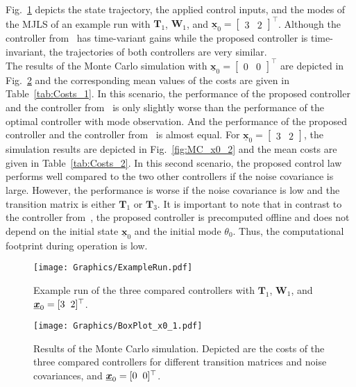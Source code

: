 \documentclass[preprint,1p,11pt]{IR-Template/ISAS_IR}
\newcommand{\rvec}[1]{\ensuremath{{\boldsymbol{\underline{#1}}}}}
\newcommand{\mat}[1]{{\ensuremath{{\mathbf{#1}}}}}
\newcommand{\tr}{^{\top}}
\newcommand{\xsys}[1]{\rvec{x}_{#1}}
\newcommand{\wCov}{\mat{W}}
\newcommand{\modeis}[1]{\theta_{#1}}
\newcommand{\TransitionMatrix}[1]{\mat{T}_{#1}}
\begin{document}
Fig.~\ref{fig:ExampleRun} depicts the state trajectory, the applied control inputs, and the modes of the MJLS of an example run with $\TransitionMatrix{1}$, $\wCov_1$, and $\xsys{0} = \begin{bmatrix}3 & 2 \end{bmatrix}\tr$. Although the controller from~\cite{Vargas_2013} has time-variant gains while the proposed controller is time-invariant, the trajectories of both controllers are very similar.\\

The results of the Monte Carlo simulation with $\xsys{0} = \begin{bmatrix}0 & 0 \end{bmatrix}\tr$ are depicted in Fig.~\ref{fig:MC_x0_1} and the corresponding mean values of the costs are given in Table~\ref{tab:Costs_1}. In this scenario, the performance of the proposed controller and the controller from~\cite{Vargas_2013} is only slightly worse than the performance of the optimal controller with mode observation. And the performance of the proposed controller and the controller from~\cite{Vargas_2013} is almost equal. For $\xsys{0}=\begin{bmatrix}3&2\end{bmatrix}$, the simulation results are depicted in Fig.~\ref{fig:MC_x0_2} and the mean costs are given in Table~\ref{tab:Costs_2}. In this second scenario, the proposed control law performs well compared to the two other controllers if the noise covariance is large. However, the performance is worse if the noise covariance is low and the transition matrix is either $\TransitionMatrix{1}$ or $\TransitionMatrix{3}$. It is important to note that in contrast to the controller from~\cite{Vargas_2013}, the proposed controller is precomputed offline and does not depend on the initial state $\xsys{0}$ and the initial mode $\modeis{0}$. Thus, the computational footprint during operation is low.\\

\begin{figure}[h]
\centering
\texttt{[image: Graphics/ExampleRun.pdf]}
\caption{Example run of the three compared controllers with $\TransitionMatrix{1}$, $\wCov_1$, and $\xsys{0} =\lbrack 3\hspace{2mm}  2\rbrack\tr$.}
\label{fig:ExampleRun}
\end{figure}

\begin{figure}[h]
\centering
\texttt{[image: Graphics/BoxPlot\_x0\_1.pdf]}
\caption{Results of the Monte Carlo simulation. Depicted are the costs of the three compared controllers for different transition matrices and noise covariances, and $\xsys{0} =\lbrack 0\hspace{2mm}  0\rbrack\tr$.}
\label{fig:MC_x0_1}
\end{figure}
\end{document}
